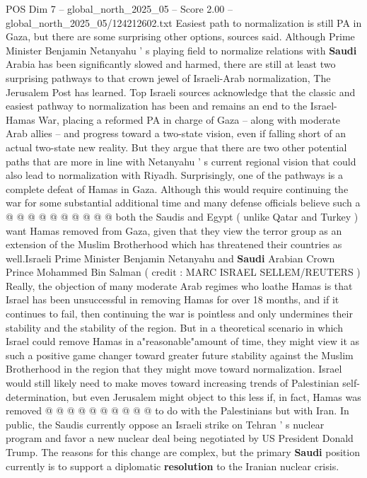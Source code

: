 \begin{textsample}{POS Dim 7 – global\_north\_2025\_05 – Score 2.00 – global\_north\_2025\_05/124212602.txt}  \label{ex:f7_pos_346}
Easiest path to normalization is still PA in Gaza, but there are some surprising other options, sources said.
Although Prime Minister Benjamin Netanyahu ' s playing field to normalize relations with \textbf{Saudi} Arabia has been significantly slowed and harmed, there are still at least two surprising pathways to that crown jewel of Israeli-Arab normalization, The Jerusalem Post has learned.
Top Israeli sources acknowledge that the classic and easiest pathway to normalization has been and remains an end to the Israel-Hamas War, placing a reformed PA in charge of Gaza -- along with moderate Arab allies -- and progress toward a two-state vision, even if falling short of an actual two-state new reality.
But they argue that there are two other potential paths that are more in line with Netanyahu ' s current regional vision that could also lead to normalization with Riyadh.
Surprisingly, one of the pathways is a complete defeat of Hamas in Gaza.
Although this would require continuing the war for some substantial additional time and many defense officials believe such a @ @ @ @ @ @ @ @ @ @ both the Saudis and Egypt ( unlike Qatar and Turkey ) want Hamas removed from Gaza, given that they view the terror group as an extension of the Muslim Brotherhood which has threatened their countries as well.Israeli Prime Minister Benjamin Netanyahu and \textbf{Saudi} Arabian Crown Prince Mohammed Bin Salman ( credit : MARC ISRAEL SELLEM/REUTERS ) Really, the objection of many moderate Arab regimes who loathe Hamas is that Israel has been unsuccessful in removing Hamas for over 18 months, and if it continues to fail, then continuing the war is pointless and only undermines their stability and the stability of the region.
But in a theoretical scenario in which Israel could remove Hamas in a"reasonable"amount of time, they might view it as such a positive game changer toward greater future stability against the Muslim Brotherhood in the region that they might move toward normalization.
Israel would still likely need to make moves toward increasing trends of Palestinian self-determination, but even Jerusalem might object to this less if, in fact, Hamas was removed @ @ @ @ @ @ @ @ @ @ to do with the Palestinians but with Iran.
In public, the Saudis currently oppose an Israeli strike on Tehran ' s nuclear program and favor a new nuclear deal being negotiated by US President Donald Trump.
The reasons for this change are complex, but the primary \textbf{Saudi} position currently is to support a diplomatic \textbf{resolution} to the Iranian nuclear crisis.

\end{textsample}
